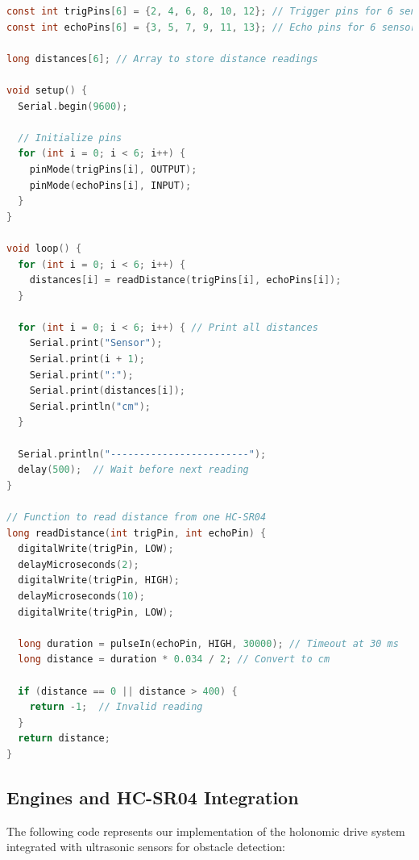 \documentclass{article}
\begin{document}
\begin{lstlisting}[language=C, basicstyle=\ttfamily\footnotesize, frame=single, xleftmargin=10mm, xrightmargin=10mm]
const int trigPins[6] = {2, 4, 6, 8, 10, 12}; // Trigger pins for 6 sensors
const int echoPins[6] = {3, 5, 7, 9, 11, 13}; // Echo pins for 6 sensors

long distances[6]; // Array to store distance readings

void setup() {
  Serial.begin(9600);

  // Initialize pins
  for (int i = 0; i < 6; i++) {
    pinMode(trigPins[i], OUTPUT);
    pinMode(echoPins[i], INPUT);
  }
}

void loop() {
  for (int i = 0; i < 6; i++) {
    distances[i] = readDistance(trigPins[i], echoPins[i]);
  }

  for (int i = 0; i < 6; i++) { // Print all distances
    Serial.print("Sensor");
    Serial.print(i + 1);
    Serial.print(":");
    Serial.print(distances[i]);
    Serial.println("cm");
  }

  Serial.println("------------------------");
  delay(500);  // Wait before next reading
}

// Function to read distance from one HC-SR04
long readDistance(int trigPin, int echoPin) {
  digitalWrite(trigPin, LOW);
  delayMicroseconds(2);
  digitalWrite(trigPin, HIGH);
  delayMicroseconds(10);
  digitalWrite(trigPin, LOW);

  long duration = pulseIn(echoPin, HIGH, 30000); // Timeout at 30 ms
  long distance = duration * 0.034 / 2; // Convert to cm
  
  if (distance == 0 || distance > 400) {
    return -1;  // Invalid reading
  }
  return distance;
}
\end{lstlisting}

\subsection{Engines and HC-SR04 Integration}
The following code represents our implementation of the holonomic drive system integrated with ultrasonic sensors for obstacle detection:
\end{document}
